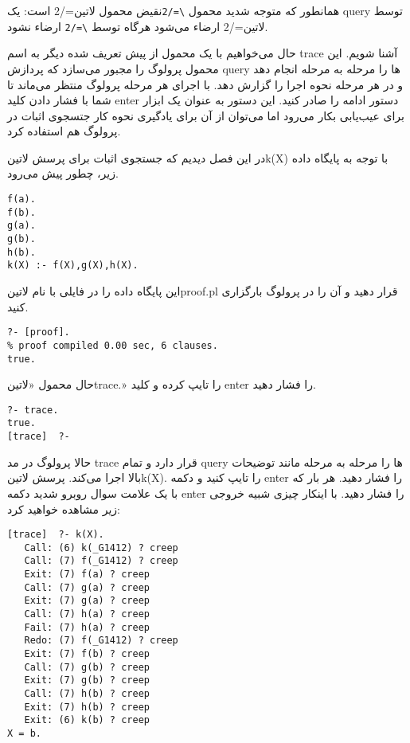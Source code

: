 همانطور که متوجه شدید محمول \verb!\=/2!نقیض محمول ‌لاتین{=/2} است: یک query توسط ‌لاتین{=/2} ارضاء می‌شود هرگاه توسط \verb!\=/2! ارضاء‌ نشود.

حال می‌خواهیم با یک محمول از پیش تعریف شده دیگر به اسم trace آشنا شویم. این محمول پرولوگ را مجبور می‌سازد که پردازش query ها را مرحله به مرحله انجام دهد و در هر مرحله نحوه اجرا را گزارش دهد. با اجرای هر مرحله پرولوگ منتظر می‌ماند تا شما با فشار دادن کلید enter دستور ادامه را صادر کنید. این دستور به عنوان یک ابزار برای عیب‌یابی بکار می‌رود اما می‌توان از آن برای یادگیری نحوه کار جتسجوی اثبات در پرولوگ هم استفاده کرد.

در این فصل دیدیم که جستجوی اثبات برای پرسش ‌لاتین{k(X)} با توجه به پایگاه داده زیر، چطور پیش می‌رود.

\begin{latin}
\begin{lstlisting}
f(a).
f(b).
g(a).
g(b).
h(b).
k(X) :- f(X),g(X),h(X).
\end{lstlisting}
\end{latin}

این پایگاه داده را در فایلی با نام ‌لاتین{proof.pl} قرار دهید و آن را در پرولوگ بارگزاری کنید.

\begin{latin}
\begin{lstlisting}
?- [proof].
% proof compiled 0.00 sec, 6 clauses.
true.
\end{lstlisting}
\end{latin}

حال محمول «‌لاتین{trace.}» را تایپ کرده و کلید enter را فشار دهید.

\begin{latin}
\begin{lstlisting}
?- trace.
true.
[trace]  ?-
\end{lstlisting}
\end{latin}

حالا پرولوگ در مد trace قرار دارد و تمام query ها را مرحله به مرحله مانند توضیحات بالا اجرا می‌کند. پرسش ‌لاتین{k(X).} را تایپ کنید و دکمه enter را فشار دهید. هر بار که با یک علامت سوال روبرو شدید دکمه enter را فشار دهید. با اینکار چیزی شبیه خروجی زیر مشاهده خواهید کرد:

\begin{latin}
\begin{lstlisting}
[trace]  ?- k(X).
   Call: (6) k(_G1412) ? creep
   Call: (7) f(_G1412) ? creep
   Exit: (7) f(a) ? creep
   Call: (7) g(a) ? creep
   Exit: (7) g(a) ? creep
   Call: (7) h(a) ? creep
   Fail: (7) h(a) ? creep
   Redo: (7) f(_G1412) ? creep
   Exit: (7) f(b) ? creep
   Call: (7) g(b) ? creep
   Exit: (7) g(b) ? creep
   Call: (7) h(b) ? creep
   Exit: (7) h(b) ? creep
   Exit: (6) k(b) ? creep
X = b.
\end{lstlisting}
\end{latin}

